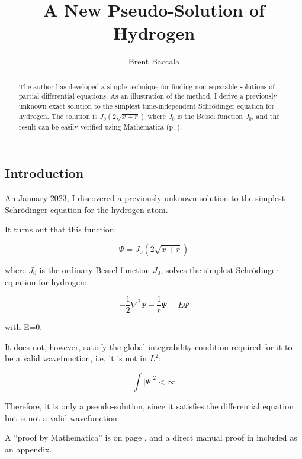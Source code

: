 \documentclass{article}
\title{A New Pseudo-Solution of Hydrogen}
\author{Brent Baccala}
\begin{document}
\parindent 0pt

\maketitle

\begin{abstract}
The author has developed a simple technique
for finding non-separable solutions of partial
differential equations.  As an illustration of the method,
I derive a previously unknown exact solution to the simplest time-independent Schr\"odinger equation for hydrogen.
The solution is $J_0(2\sqrt{x+r})$ where $J_0$ is the Bessel function $J_0$, and
the result can be easily verified using Mathematica (p. \pageref{verification}).
\end{abstract}

\parskip 12pt

\subsection*{Introduction}

An January 2023, I discovered a previously unknown solution to the simplest Schrödinger equation for the hydrogen atom.

It turns out that this function:

\begin{equation}
\label{solution}
\Psi = J_0(2\sqrt{x+r})
\end{equation}

where $J_0$ is the ordinary Bessel function $J_0$, solves the simplest Schrödinger equation for hydrogen:

\begin{equation}
-\frac{1}{2}\nabla^2 \Psi - \frac{1}{r}\Psi = E \Psi
\end{equation}

with E=0.

It does not, however, satisfy the global integrability condition required for it to be a valid wavefunction,
i.e, it is not in $L^2$:

\begin{equation}
\label{L2 condition}
\int|\Psi|^2 < \infty
\end{equation}

Therefore, it is only a pseudo-solution, since it satisfies the differential equation but is not a valid wavefunction.

A ``proof by Mathematica'' is on page \pageref{verification}, and a direct manual proof in included as an appendix.
\end{document}
